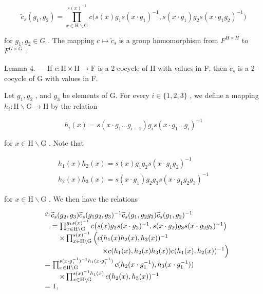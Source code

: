 \[
\widetilde {c} _ {s} (g _ {1}, g _ {2}) = \prod_ {x \in \mathrm{H} \backslash \mathrm{G}} ^ {s (x) ^ {- 1}} c \bigl (s (x) g _ {1} s (x \cdot g _ {1}) ^ {- 1}, s (x \cdot g _ {1}) g _ {2} s (x \cdot g _ {1} g _ {2}) ^ {- 1} \bigr)
\]

for \(g_{1}, g_{2} \in G\) . The mapping \(c \mapsto \widetilde{c}_{s}\) is a group homomorphism from \(F^{H \times H}\) to \(F^{G \times G}\) .

Lemma 4. --- If \(c: \mathrm{H} \times \mathrm{H} \to \mathrm{F}\) is a 2-cocycle of H with values in F, then \(\widetilde{c}_s\) is a 2-cocycle of G with values in F.

Let \(g_1, g_2\) , and \(g_3\) be elements of G. For every \(i \in \{1, 2, 3\}\) , we define a mapping \(h_i: \mathrm{H} \backslash \mathrm{G} \to \mathrm{H}\) by the relation

\[
h _ {i} (x) = s \left(x \cdot g _ {1} \dots g _ {i - 1}\right) g _ {i} s \left(x \cdot g _ {1} \dots g _ {i}\right) ^ {- 1}
\]

for \(x\in \mathrm{H}\backslash \mathrm{G}\) . Note that

\[
\begin{array}{l} {h _ {1} (x) h _ {2} (x) = s (x) g _ {1} g _ {2} s (x \cdot g _ {1} g _ {2}) ^ {- 1}} \\ {h _ {2} (x) h _ {3} (x) = s (x \cdot g _ {1}) g _ {2} g _ {3} s (x \cdot g _ {1} g _ {2} g _ {3}) ^ {- 1}} \end{array}
\]

for \(x \in \mathrm{H} \backslash \mathrm{G}\) . We then have the relations

\[
\begin{array}{r l} & ^ {g _ {1}} \widetilde {c} _ {s} (g _ {2}, g _ {3}) \widetilde {c} _ {s} (g _ {1} g _ {2}, g _ {3}) ^ {- 1} \widetilde {c} _ {s} (g _ {1}, g _ {2} g _ {3}) \widetilde {c} _ {s} (g _ {1}, g _ {2}) ^ {- 1} \\ & \quad = \prod_ {x \in \mathrm{H} \backslash \mathrm{G}} ^ {g _ {1} s (x) ^ {- 1}} c \big (s (x) g _ {2} s (x \cdot g _ {2}) ^ {- 1}, s (x \cdot g _ {2}) g _ {3} s (x \cdot g _ {2} g _ {3}) ^ {- 1} \big) \\ & \qquad \times \prod_ {x \in \mathrm{H} \backslash \mathrm{G}} ^ {s (x) ^ {- 1}} \Big (c (h _ {1} (x) h _ {2} (x), h _ {3} (x)) ^ {- 1} \\ & \qquad \qquad \qquad \qquad \times c (h _ {1} (x), h _ {2} (x) h _ {3} (x))   c (h _ {1} (x), h _ {2} (x)) ^ {- 1} \Big) \\ & = \prod_ {x \in \mathrm{H} \backslash \mathrm{G}} ^ {s (x \cdot g _ {1} ^ {- 1}) ^ {- 1} h _ {1} (x \cdot g _ {1} ^ {- 1})} c (h _ {2} (x \cdot g _ {1} ^ {- 1}), h _ {3} (x \cdot g _ {1} ^ {- 1})) \\ & \qquad \times \prod_ {x \in \mathrm{H} \backslash \mathrm{G}} ^ {s (x) ^ {- 1} h _ {1} (x)} c (h _ {2} (x), h _ {3} (x)) ^ {- 1} \\ & = 1, \end{array}
\]

